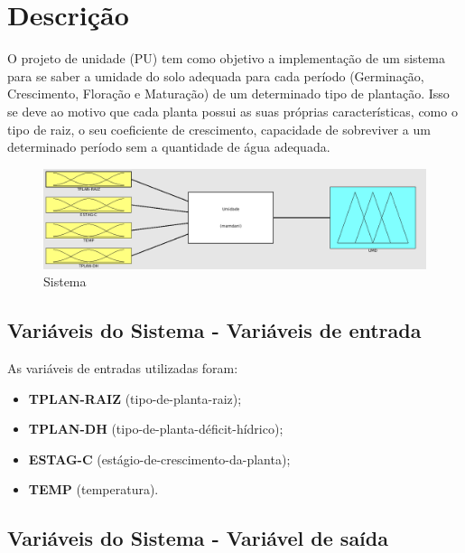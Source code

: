 \section{Descrição}

O projeto de unidade (PU) tem como objetivo a implementação de um sistema \fuzzy para se saber a umidade do solo adequada para cada período (Germinação, Crescimento, Floração e Maturação) de um  determinado tipo de plantação. Isso se deve ao motivo que cada planta possui as suas próprias características, como o tipo de raiz, o seu coeficiente de crescimento, capacidade de sobreviver a um determinado período sem a quantidade de água adequada.    


\begin{figure}[h!]
\centering
\includegraphics[width=1\linewidth]{Descricao/Imagens/Sistema}
\caption{Sistema \fuzzy}
\label{fig:Sistema}
\end{figure}


\subsection{Variáveis do Sistema - Variáveis de entrada}

As variáveis de entradas utilizadas foram: 

\begin{itemize}
	\item \textbf{TPLAN-RAIZ} (tipo-de-planta-raiz);
	\item \textbf{TPLAN-DH} (tipo-de-planta-déficit-hídrico);
	\item \textbf{ESTAG-C} (estágio-de-crescimento-da-planta);
	\item \textbf{TEMP} (temperatura).
\end{itemize}

\newpage

\newpage

\newpage




\subsection{Variáveis do Sistema - Variável de saída}





